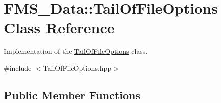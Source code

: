 \hypertarget{classFMS__Data_1_1TailOfFileOptions}{
\section{FMS\_\-Data::TailOfFileOptions Class Reference}
\label{classFMS__Data_1_1TailOfFileOptions}
}


Implementation of the \hyperlink{classFMS__Data_1_1TailOfFileOptions}{TailOfFileOptions} class.  




{\ttfamily \#include $<$TailOfFileOptions.hpp$>$}

\subsection*{Public Member Functions}

